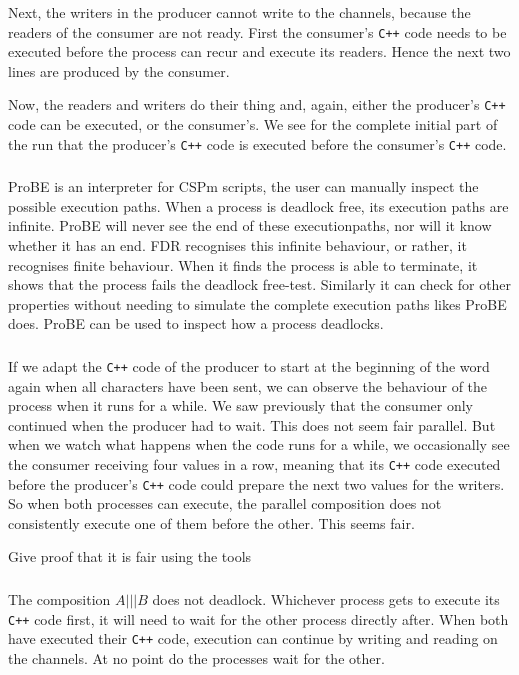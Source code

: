 \documentclass[a4paper,twoside,11pt]{article}
\newcommand{\cpp}{{\tt C++} }
\begin{document}
Next, the writers in the producer cannot write to the channels, because the readers of the consumer are not ready. First the consumer's \cpp code needs to be executed before the process can recur and execute its readers. Hence the next two lines are produced by the consumer.

Now, the readers and writers do their thing and, again, either the producer's \cpp code can be executed, or the consumer's. We see for the complete initial part of the run that the producer's \cpp code is executed before the consumer's \cpp code.

\subsubsection{}
ProBE is an interpreter for CSPm scripts, the user can manually inspect the possible execution paths. When a process is deadlock free, its execution paths are infinite. ProBE will never see the end of these executionpaths, nor will it know whether it has an end. FDR recognises this infinite behaviour, or rather, it recognises finite behaviour. When it finds the process is able to terminate, it shows that the process fails the deadlock free-test. Similarly it can check for other properties without needing to simulate the complete execution paths likes ProBE does. ProBE can be used to inspect how a process deadlocks.

\subsubsection{}
If we adapt the \cpp code of the producer to start at the beginning of the word again when all characters have been sent, we can observe the behaviour of the process when it runs for a while. We saw previously that the consumer only continued when the producer had to wait. This does not seem fair parallel. But when we watch what happens when the code runs for a while, we occasionally see the consumer receiving four values in a row, meaning that its \cpp code executed before the producer's \cpp code could prepare the next two values for the writers. So when both processes can execute, the parallel composition does not consistently execute one of them before the other. This seems fair.

\color{red}
Give proof that it is fair using the tools
\color{black}

\subsubsection{}
The composition $A ||| B$ does not deadlock. Whichever process gets to execute its \cpp code first, it will need to wait for the other process directly after. When both have executed their \cpp code, execution can continue by writing and reading on the channels. At no point do the processes wait for the other.
\end{document}
